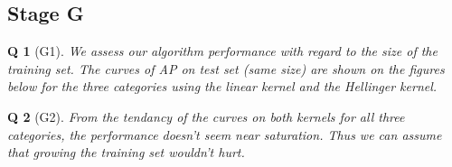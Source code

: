\documentclass[11pt]{article}
\theoremstyle{exo}
\newtheorem*{exercise}{Q}
\newcommand{\1}{\mathbf{1}}
\newcommand{\0}{\mathbf{0}}
\begin{document}
\subsection*{Stage G}
\begin{exercise}[G1]
	We assess our algorithm performance with regard to the size of the training set. The curves of AP on test set (same size) are shown on the figures below for the three categories using the linear kernel and the Hellinger kernel.
	\begin{figure}[H]
	\centering
	\end{figure}
\end{exercise}

\begin{exercise}[G2]
From the tendancy of the curves on both kernels for all three categories, the performance doesn't seem near saturation. Thus we can assume that growing the training set wouldn't hurt.
\end{exercise}
\end{document}
